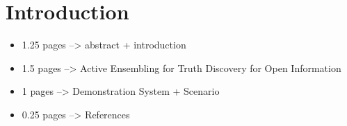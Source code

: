 \section{Introduction}
\begin{itemize}
 \item 1.25 pages --> abstract + introduction
 \item 1.5 pages --> Active Ensembling for Truth Discovery for Open Information
 \item 1 pages --> Demonstration System + Scenario
 \item 0.25 pages --> References
\end{itemize}
